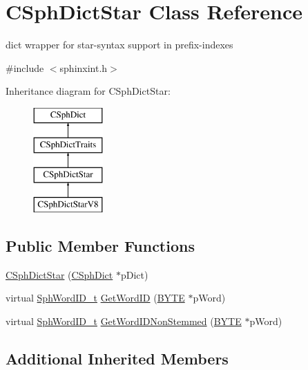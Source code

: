 \hypertarget{classCSphDictStar}{\section{C\-Sph\-Dict\-Star Class Reference}
\label{classCSphDictStar}
}


dict wrapper for star-\/syntax support in prefix-\/indexes  




{\ttfamily \#include $<$sphinxint.\-h$>$}

Inheritance diagram for C\-Sph\-Dict\-Star\-:\begin{figure}[H]
\begin{center}
\leavevmode
\includegraphics[height=4.000000cm]{classCSphDictStar}
\end{center}
\end{figure}
\subsection*{Public Member Functions}
\begin{DoxyCompactItemize}
\item 
\hyperlink{classCSphDictStar_a4a3f451c0496acff0da4b9a33d2dad58}{C\-Sph\-Dict\-Star} (\hyperlink{classCSphDict}{C\-Sph\-Dict} $\ast$p\-Dict)
\item 
virtual \hyperlink{sphinx_8h_a80a94d5984fdf9214a98f3e5e65df963}{Sph\-Word\-I\-D\-\_\-t} \hyperlink{classCSphDictStar_a4e569ff418bf922b57c9c22c30d40bc9}{Get\-Word\-I\-D} (\hyperlink{sphinxstd_8h_a4ae1dab0fb4b072a66584546209e7d58}{B\-Y\-T\-E} $\ast$p\-Word)
\item 
virtual \hyperlink{sphinx_8h_a80a94d5984fdf9214a98f3e5e65df963}{Sph\-Word\-I\-D\-\_\-t} \hyperlink{classCSphDictStar_af3f3be1b8c5c4cb4fccc39bc595c3778}{Get\-Word\-I\-D\-Non\-Stemmed} (\hyperlink{sphinxstd_8h_a4ae1dab0fb4b072a66584546209e7d58}{B\-Y\-T\-E} $\ast$p\-Word)
\end{DoxyCompactItemize}
\subsection*{Additional Inherited Members}


